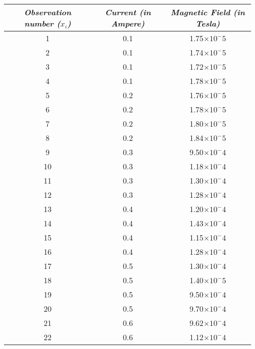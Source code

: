 \begin{table}[H]
        \centering
            \begin{tabular}{|c|c|c|}
            \hline\hline
            \textit{Observation number ($x_i$)} & \textit{Current (in Ampere)} & \textit{Magnetic Field (in Tesla)}\\
            \hline
            \hline
            1 & 0.1 & 1.75$\times10^-5$ \\
            \hline
            2 & 0.1 & 1.74$\times10^-5$ \\
            \hline
            3 & 0.1 & 1.72$\times10^-5$ \\
            \hline
            4 & 0.1 & 1.78$\times10^-5$ \\
            \hline
            5 & 0.2 & 1.76$\times10^-5$ \\
            \hline
            6 & 0.2 & 1.78$\times10^-5$ \\
            \hline
            7 & 0.2 & 1.80$\times10^-5$ \\
            \hline
            8 & 0.2 & 1.84$\times10^-5$ \\
            \hline
            9 & 0.3 & 9.50$\times10^-4$ \\
            \hline
            10 & 0.3 & 1.18$\times10^-4$ \\
            \hline
            11 & 0.3 & 1.30$\times10^-4$ \\
            \hline
            12 & 0.3 & 1.28$\times10^-4$ \\
            \hline
            13 & 0.4 & 1.20$\times10^-4$ \\
            \hline
            14 & 0.4 & 1.43$\times10^-4$ \\
            \hline
            15 & 0.4 & 1.15$\times10^-4$ \\
            \hline
            16 & 0.4 & 1.28$\times10^-4$ \\
            \hline
            17 & 0.5 & 1.30$\times10^-4$ \\
            \hline
            18 & 0.5 & 1.40$\times10^-5$ \\
            \hline
            19 & 0.5 & 9.50$\times10^-4$ \\
            \hline
            20 & 0.5 & 9.70$\times10^-4$ \\
            \hline
            21 & 0.6 & 9.62$\times10^-4$ \\
            \hline
            22 & 0.6 & 1.12$\times10^-4$ \\

\end{tabular}
\end{table}

